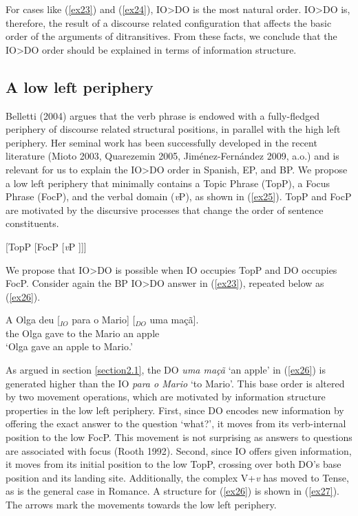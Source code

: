 \documentclass[output=paper,modfonts,nonflat]{langsci/langscibook}
\begin{document}
For cases like (\ref{ex23}) and (\ref{ex24}), IO>DO is the most natural order. IO>DO is, therefore, the result of a discourse related configuration that affects the basic order of the arguments of ditransitives. From these facts, we conclude that the IO>DO order should be explained in terms of information structure.

\subsection{A low left periphery}\label{section3.2}
Belletti (2004) argues that the verb phrase is endowed with a fully-fledged periphery of discourse related structural positions, in parallel with the high left periphery. Her seminal work has been successfully developed in the recent literature (Mioto 2003, Quarezemin 2005, Jiménez-Fernández 2009, a.o.) and is relevant for us to explain the IO>DO order in Spanish, EP, and BP. We propose a low left periphery that minimally contains a Topic Phrase (TopP), a Focus Phrase (FocP), and the verbal domain (\textit{v}P), as shown in (\ref{ex25}). TopP and FocP are motivated by the discursive processes that change the order of sentence constituents.

\ea \label{ex25}
	[TopP [FocP [\textit{v}P ]]]
\z

We propose that IO>DO is possible when IO occupies TopP and DO occupies FocP. Consider again the BP IO>DO answer in (\ref{ex23}), repeated below as (\ref{ex26}).

\ea \label{ex26}
	\gll A   Olga deu [$_{IO}$ para o   Mario] [$_{DO}$ uma maçã].\\
			the Olga gave \hspaceThis{[$_{IO}$} to the Mario  \hspaceThis{[$_{DO}$} an apple\\
	\glt ‘Olga gave an apple to Mario.’
\z

As argued in section \ref{section2.1}, the DO \textit{uma maçã} ‘an apple’ in (\ref{ex26}) is generated higher than the IO \textit{para o Mario} ‘to Mario’. This base order is altered by two movement operations, which are motivated by information structure properties in the low left periphery. First, since DO encodes new information by offering the exact answer to the question ‘what?’, it moves from its verb-internal position to the low FocP. This movement is not surprising as answers to questions are associated with focus (Rooth 1992). Second, since IO offers given information, it moves from its initial position to the low TopP, crossing over both DO’s base position and its landing site. Additionally, the complex V+\textit{v} has moved to Tense, as is the general case in Romance. A structure for (\ref{ex26}) is shown in (\ref{ex27}). The arrows mark the movements towards the low left periphery.
\end{document}
